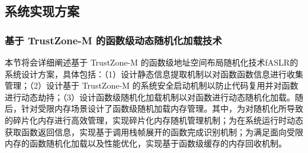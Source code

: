 \documentclass[12pt,a4paper]{ctexart}
\numberwithin{figure}{section}
\begin{document}
\subsection{系统实现方案}

\subsubsection{基于 TrustZone-M 的函数级动态随机化加载技术}
\par 本节将会详细阐述基于 TrustZone-M 的函数级地址空间布局随机化技术fASLR的系统设计方案，具体包括：（1）设计静态信息提取机制以对函数函数信息进行收集管理；（2）设计基于 TrustZone-M 的系统安全启动机制以防止代码复用并对函数进行动态劫持；（3）设计函数级随机化加载机制以对函数进行动态随机化加载。随后，针对受限内存场景设计了函数级随机加载内存管理。其中，为对随机化所导致的碎片化内存进行高效管理，实现碎片化内存随机管理机制；为在系统运行时动态获取函数返回信息，实现基于调用栈帧展开的函数完成识别机制；为满足面向受限内存的函数随机化加载以及性能优化，实现基于函数级缓存的内存回收机制。
\end{document}
